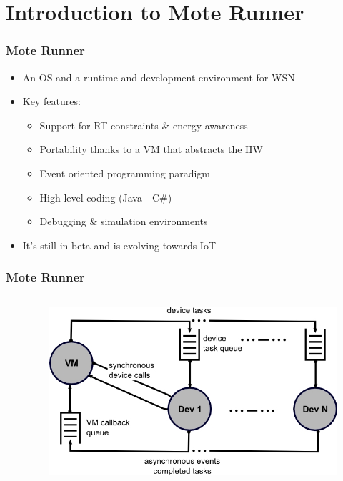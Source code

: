\section{Introduction to Mote Runner}
\begin{frame}[fragile]
  \frametitle{Mote Runner}
  \begin{itemize}
    \item An OS and a runtime and development environment for WSN
    \item Key features:
    \begin{itemize}
      \item Support for RT constraints \& energy awareness
      \item Portability thanks to a VM that abstracts the HW
      \item Event oriented programming paradigm
      \item High level coding (Java - C\#)
      \item Debugging \& simulation environments
    \end{itemize}
    \item It’s still in beta and is evolving towards IoT
  \end{itemize}
\end{frame}

\begin{frame}[fragile]
  \frametitle{Mote Runner}
  \begin{columns}
    \begin{column}{.48\linewidth}
    	
    \end{column}
    \hfill
    \begin{column}{.5\linewidth}
    	\begin{figure}
	  \centering
	  \includegraphics[width=\textwidth]{img/vm-dev.jpg}
    	\end{figure}
    \end{column}
  \end{columns}
\end{frame}

